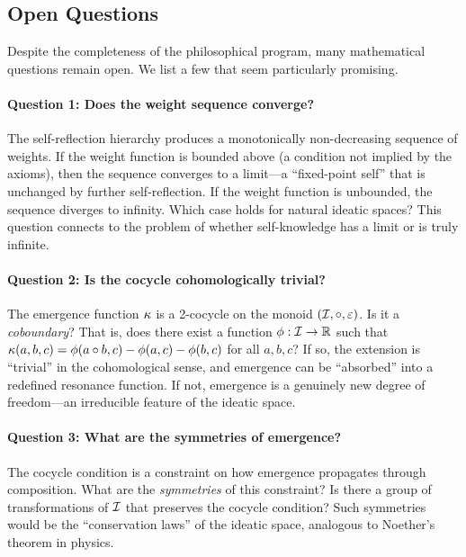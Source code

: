 \subsection{Open Questions}

Despite the completeness of the philosophical program, many mathematical
questions remain open.  We list a few that seem particularly promising.

\paragraph{Question 1: Does the weight sequence converge?}
The self-reflection hierarchy produces a monotonically non-decreasing sequence
of weights.  If the weight function is bounded above (a condition not implied by
the axioms), then the sequence converges to a limit---a ``fixed-point self''
that is unchanged by further self-reflection.  If the weight function is
unbounded, the sequence diverges to infinity.  Which case holds for natural
ideatic spaces?  This question connects to the problem of whether
self-knowledge has a limit or is truly infinite.

\paragraph{Question 2: Is the cocycle cohomologically trivial?}
The emergence function $\kappa$ is a 2-cocycle on the monoid $(\mathcal{I}, \circ,
\varepsilon)$.  Is it a \emph{coboundary}?  That is, does there exist a function
$\phi : \mathcal{I} \to \mathbb{R}$ such that $\kappa(a, b, c) = \phi(a \circ b, c) -
\phi(a, c) - \phi(b, c)$ for all $a, b, c$?  If so, the extension is
``trivial'' in the cohomological sense, and emergence can be ``absorbed'' into
a redefined resonance function.  If not, emergence is a genuinely new degree
of freedom---an irreducible feature of the ideatic space.

\paragraph{Question 3: What are the symmetries of emergence?}
The cocycle condition is a constraint on how emergence propagates through
composition.  What are the \emph{symmetries} of this constraint?  Is there a
group of transformations of $\mathcal{I}$ that preserves the cocycle condition?  Such
symmetries would be the ``conservation laws'' of the ideatic space, analogous
to Noether's theorem in physics.

